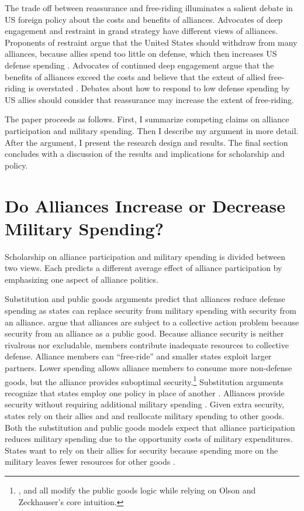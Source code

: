 \documentclass[12pt]{article}
\begin{document}
The trade off between reassurance and free-riding illuminates a salient debate in US foreign policy about the costs and benefits of alliances. 
Advocates of deep engagement \citep{Brooksetal2013} and restraint \citep{Posen2014} in grand strategy have different views of alliances. 
Proponents of restraint argue that the United States should withdraw from many alliances, because allies spend too little on defense, which then increases US defense spending \citep{Preble2009}.
Advocates of continued deep engagement argue that the benefits of alliances exceed the costs and believe that the extent of allied free-riding is overstated \citep{BrandsFeaver2017}. 
Debates about how to respond to low defense spending by US allies should consider that reassurance may increase the extent of free-riding. 


The paper proceeds as follows. 
First, I summarize competing claims on alliance participation and military spending. 
Then I describe my argument in more detail. 
After the argument, I present the research design and results. 
The final section concludes with a discussion of the results and implications for scholarship and policy.  



\section*{Do Alliances Increase or Decrease Military Spending?}


Scholarship on alliance participation and military spending is divided between two views.
Each predicts a different average effect of alliance participation by emphasizing one aspect of alliance politics.   


Substitution and public goods arguments predict that alliances reduce defense spending as states can replace security from military spending with security from an alliance.
\citet{OlsonZeckhauser1966} argue that alliances are subject to a collective action problem because security from an alliance as a public good.
Because alliance security is neither rivalrous nor excludable, members contribute inadequate resources to collective defense. 
Alliance members can ``free-ride'' and smaller states exploit larger partners. 
Lower spending allows alliance members to consume more non-defense goods, but the alliance provides suboptimal security.\footnote{\citet{SandlerForbes1980}, \citet{Oneal1990} and \citet{SandlerHartley2001} all modify the public goods logic while relying on Olson and Zeckhauser's core intuition.} 
Substitution arguments recognize that states employ one policy in place of another \citep{MostStarr1989}.
Alliances provide security without requiring additional military spending \citep{Morrow1993, Conybeare1994}. 
Given extra security, states rely on their allies and and reallocate military spending to other goods. 
Both the substitution and public goods models expect that alliance participation reduces military spending due to the opportunity costs of military expenditures. 
States want to rely on their allies for security because spending more on the military leaves fewer resources for other goods \citep{Fordham1998, Fearon2018}.
\end{document}
